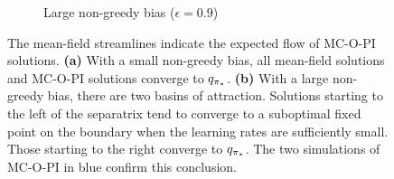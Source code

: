 \begin{figure}[hp]
\begin{subfigure}[b]{0.9\textwidth}
\begin{tikzpicture}[scale=1]
        \end{tikzpicture}

        \caption{Large non-greedy bias ($\epsilon = 0.9$)}
        \label{fig: experiment for off-policy bias large}
    \end{subfigure}%
    
    
    \caption{The mean-field streamlines indicate the expected flow of MC-O-PI solutions.
    {\sffamily\textbf{(a)}} With a small non-greedy bias, all mean-field solutions and MC-O-PI solutions converge to $q_{{\pi}_*}$.
    {\sffamily\textbf{(b)}} With a large non-greedy bias, there are two basins of attraction.
    Solutions starting to the left of the separatrix tend to converge to a suboptimal fixed point on the boundary when the learning rates are sufficiently small.
    Those starting to the right converge to $q_{{\pi}_*}$. The two simulations of MC-O-PI in blue confirm this conclusion.}
    \label{fig: experiment for off-policy bias}
\end{figure}